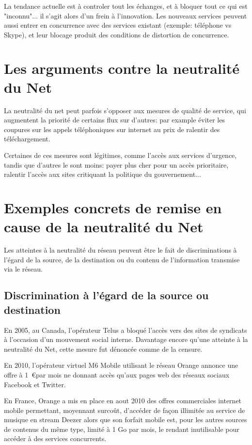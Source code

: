 \documentclass[12pt]{../fiche}
\begin{document}
La tendance actuelle est à controler tout les échanges, et à bloquer tout
ce qui est "inconnu"... il s'agit alors d'un frein à l'innovation.
Les nouveaux services peuvent aussi entrer en concurrence avec des
services existant (exemple: téléphone vs Skype), et leur blocage produit
des conditions de distortion de concurrence.

\section{Les arguments contre la neutralité du Net}

La neutralité du net peut parfois s'opposer aux mesures de \og{}qualité
de service\fg{}, qui augmentent la priorité de certains flux sur d'autres:
par example éviter les coupures sur les appels téléphoniques sur internet
au prix de ralentir des téléchargement.

Certaines de ces mesures sont légitimes, comme l'accès aux services d'urgence,
tandis que d'autres le sont moins: payer plus cher pour un accès prioritaire,
ralentir l'accès aux sites critiquant la politique du gouvernement...

\section{Exemples concrets de remise en cause de la neutralité du Net}

Les atteintes à la neutralité du réseau peuvent être le fait de
discriminations à l'égard de la source, de la destination ou du contenu
de l'information transmise via le réseau.

\subsection{Discrimination à l'égard de la
source ou destination}

En 2005, au Canada, l'opérateur Telus a bloqué l'accès vers des sites de
syndicats à l'occasion d'un mouvement social interne. Davantage encore
qu'une atteinte à la neutralité du Net, cette mesure fut dénoncée comme
de la censure.

En 2010, l'opérateur virtuel M6 Mobile utilisant le réseau Orange
annonce une offre à 1~\euro par mois ne donnant accès qu'aux pages web
des réseaux sociaux Facebook et Twitter.

En France, Orange a mis en place en aout 2010 des offres commerciales
internet mobile permettant, moyennant surcoût, d'accéder de façon
illimitée au service de musique en stream Deezer alors que son forfait
mobile est, pour les autres sources de contenus du même type, limité à 1
Go par mois, le rendant inutilisable pour accéder à des services
concurrents.
\end{document}
